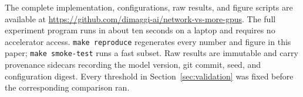 \documentclass[11pt]{article}
\begin{document}
The complete implementation, configurations, raw results, and figure scripts are
available at
\url{https://github.com/dimaggi-ai/network-vs-more-gpus}. The full experiment program
runs in about ten seconds on a laptop and requires no accelerator access.
\texttt{make reproduce} regenerates every number and figure in this paper;
\texttt{make smoke-test} runs a fast subset. Raw results are immutable and carry
provenance sidecars recording the model version, git commit, seed, and
configuration digest. Every threshold in Section~\ref{sec:validation} was fixed
before the corresponding comparison ran.



\end{document}
